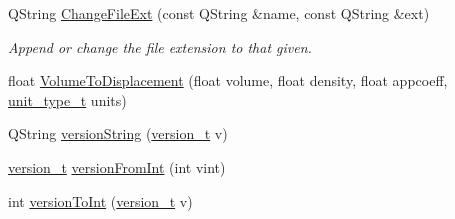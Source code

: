 \begin{DoxyCompactItemize}
Q\-String \hyperlink{namespaceShipCAD_ae416df4a72579eb3a1a418b19551eb53}{Change\-File\-Ext} (const Q\-String \&name, const Q\-String \&ext)
\begin{DoxyCompactList}\small\item\em Append or change the file extension to that given. \end{DoxyCompactList}\item 
float \hyperlink{namespaceShipCAD_ad3ca198e79658bf065f1c1c416f23670}{Volume\-To\-Displacement} (float volume, float density, float appcoeff, \hyperlink{namespaceShipCAD_ac6a7a28b4b063771afae92decb602da5}{unit\-\_\-type\-\_\-t} units)
\item 
Q\-String \hyperlink{namespaceShipCAD_a2901c6bb3e9ddd7efa9bdcc9095cc468}{version\-String} (\hyperlink{namespaceShipCAD_af3a6fa23a7318acbda7b0066b53d694f}{version\-\_\-t} v)
\item 
\hyperlink{namespaceShipCAD_af3a6fa23a7318acbda7b0066b53d694f}{version\-\_\-t} \hyperlink{namespaceShipCAD_aaacff40f3706c270a66e4c8296d17ebd}{version\-From\-Int} (int vint)
\item 
int \hyperlink{namespaceShipCAD_ad78a3ea3f966f52a2aa9befd3bfc73b0}{version\-To\-Int} (\hyperlink{namespaceShipCAD_af3a6fa23a7318acbda7b0066b53d694f}{version\-\_\-t} v)
\end{DoxyCompactItemize}
